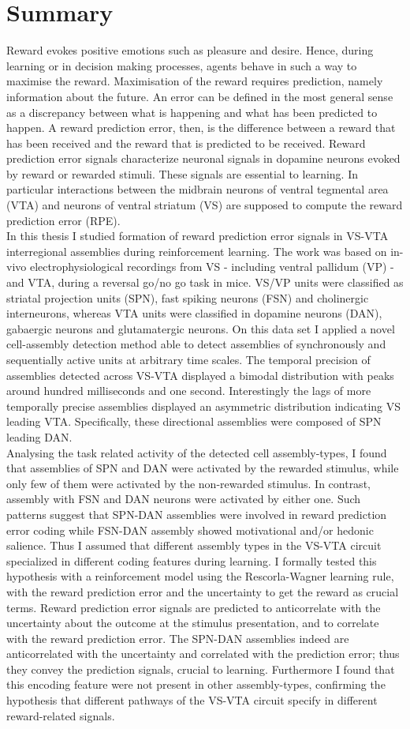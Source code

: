 \section*{Summary}
Reward evokes positive emotions such as pleasure and desire. Hence, during learning or in decision making processes, agents behave in such a way to maximise the reward. Maximisation of the reward requires prediction, namely information about the future. An error can be defined in the most general sense as a discrepancy between what is happening and what has been predicted to happen. A reward prediction error, then, is the difference between a reward that has been received and the reward that is predicted to be received. Reward prediction error signals characterize neuronal signals in dopamine neurons evoked by reward or rewarded stimuli. These signals are essential to learning. In particular interactions between the midbrain neurons of ventral tegmental area (VTA) and neurons of ventral striatum (VS) are supposed to compute the reward prediction error (RPE).\\In this thesis I studied formation of reward prediction error signals in VS-VTA interregional assemblies during reinforcement learning. The work was based on in-vivo electrophysiological recordings from VS - including ventral pallidum (VP) - and VTA, during a reversal go/no go task in mice. VS/VP units were classified as striatal projection units (SPN), fast spiking neurons (FSN) and cholinergic interneurons, whereas VTA units were classified in dopamine neurons (DAN), gabaergic neurons and glutamatergic neurons. On this data set I applied a novel cell-assembly detection method able to detect assemblies of synchronously and sequentially active units at arbitrary time scales. The temporal precision of assemblies detected across VS-VTA displayed a bimodal distribution with peaks around hundred milliseconds and one second. Interestingly the lags of more temporally precise assemblies displayed an asymmetric distribution indicating VS leading VTA. Specifically, these directional assemblies were composed of SPN leading DAN.\\Analysing the task related activity of the detected cell assembly-types, I found that assemblies of SPN and DAN were activated by the rewarded stimulus, while only few of them were activated by the non-rewarded stimulus. In contrast, assembly with FSN and DAN neurons were activated by either one. Such patterns suggest that SPN-DAN assemblies were involved in reward prediction error coding while FSN-DAN assembly showed motivational and/or hedonic salience. Thus I assumed that different assembly types in the VS-VTA circuit specialized in different coding features during learning. I formally tested this hypothesis with a reinforcement model using the Rescorla-Wagner learning rule, with the reward prediction error and the uncertainty to get the reward as crucial terms. Reward prediction error signals are predicted to anticorrelate with the uncertainty about the outcome at the stimulus presentation, and to correlate with the reward prediction error. The SPN-DAN assemblies indeed are anticorrelated with the uncertainty and correlated with the prediction error; thus they convey the prediction signals, crucial to learning. Furthermore I found that this encoding feature were not present in other assembly-types, confirming the hypothesis that different pathways of the VS-VTA circuit specify in different reward-related signals.